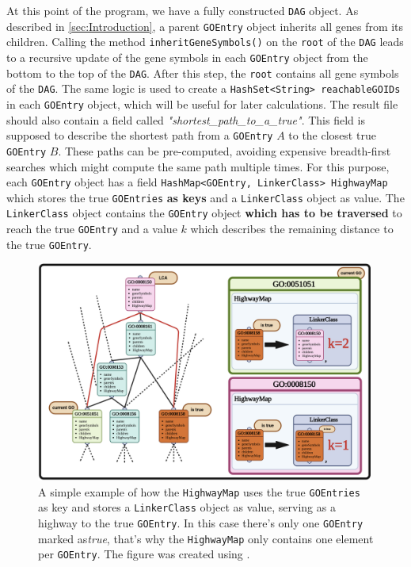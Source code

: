 \documentclass[12pt]{article}
\begin{document}
At this point of the program, we have a fully constructed \texttt{DAG} object.
As described in \ref{sec:Introduction}, a parent \texttt{GOEntry} object
inherits all genes from its children.
Calling the method \texttt{inheritGeneSymbols()} on the \texttt{root} of the \texttt{DAG}
leads to a recursive update of the gene symbols in each \texttt{GOEntry} object
from the bottom to the top of the \texttt{DAG}. After this step, the \texttt{root}
contains all gene symbols of the \texttt{DAG}. The same logic is used to 
create a \texttt{HashSet<String> reachableGOIDs} in each \texttt{GOEntry} object,
which will be useful for later calculations. The result file should also contain
a field called \textit{"shortest\_path\_to\_a\_true"}. This field is supposed to
describe the shortest path from a \texttt{GOEntry} $A$ to the closest true
\texttt{GOEntry} $B$. 
These paths can be pre-computed, avoiding expensive breadth-first searches which
might compute the same path multiple times.
For this purpose, each \texttt{GOEntry} object has a 
field \texttt{HashMap<GOEntry, LinkerClass> HighwayMap} which stores the
true \texttt{GOEntries} \textbf{as keys} and a \texttt{LinkerClass} object as value.
The \texttt{LinkerClass} object contains the \texttt{GOEntry} object
\textbf{which has to be traversed} to reach the true \texttt{GOEntry} and
a value $k$ which describes the remaining distance to the true \texttt{GOEntry}.

\begin{figure}[htpb]
    \centering
    \includegraphics[width=0.99\textwidth]{./figures/Highway.png}
    \caption{A simple example of how the \texttt{HighwayMap} uses the true \texttt{GOEntries} as key and stores a \texttt{LinkerClass} object as value,
    serving as a highway to the true \texttt{GOEntry}. In this case there's only one \texttt{GOEntry} marked as\textit{true}, that's why the
    \texttt{HighwayMap} only contains one element per \texttt{GOEntry}. The figure was created using \cite{biorender}.}
    \label{fig:-figures-Highway-png}
\end{figure}
\end{document}
